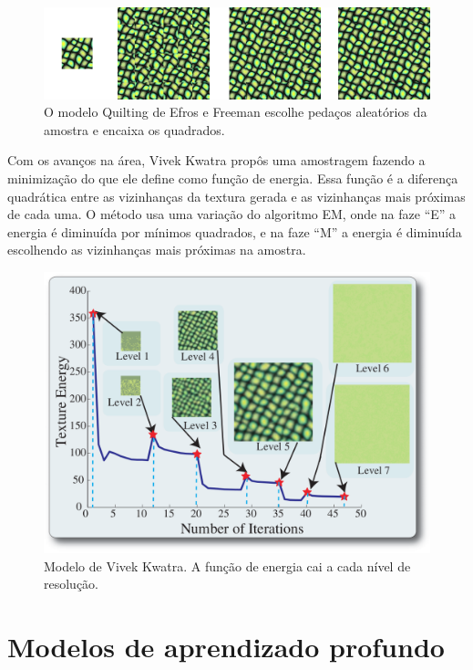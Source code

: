 \begin{figure}[!ht]
	\includegraphics[width=\linewidth]{files/assets/articles/efros2.png}
	\caption{O modelo Quilting de Efros e Freeman escolhe pedaços
	aleatórios da amostra e encaixa os quadrados.}
	\label{img:preview}
\end{figure}

Com os avanços na área,
Vivek Kwatra \cite{Kwatra2005} propôs
uma amostragem fazendo a minimização
do que ele define como função de energia. 
Essa função é a diferença quadrática
entre as vizinhanças da textura gerada
e as vizinhanças mais próximas de cada uma.
O método usa uma variação do algoritmo EM, 
onde na faze ``E'' a energia é diminuída
por mínimos quadrados, e na faze ``M'' a
energia é diminuída escolhendo as
vizinhanças mais próximas na amostra.

\begin{figure}[!ht]
	\centering
	\includegraphics[width=\linewidth*2/3]{files/assets/articles/kwatra.png}
	\caption{Modelo de Vivek Kwatra. A função de energia 
	cai a cada nível de resolução.}
	\label{img:preview}
\end{figure}


\newpage
\section{Modelos de aprendizado profundo}

